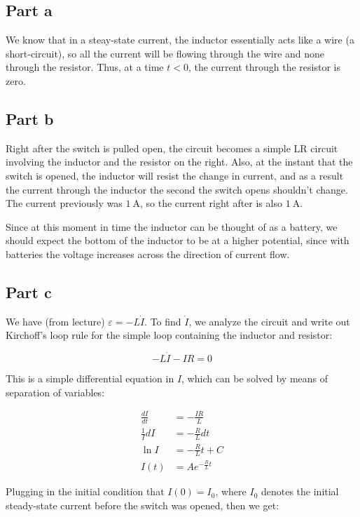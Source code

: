\documentclass{article}
\theoremstyle{definition}
\numberwithin{equation}{section}
\numberwithin{definition}{section}
\begin{document}
\subsection*{Part a} 

We know that in a steay-state current, the inductor essentially acts like a wire (a short-circuit), so all the current will be flowing through the wire and none through the resistor. Thus, at a time $t < 0$, the current through the resistor is zero.

\subsection*{Part b}
Right after the switch is pulled open, the circuit becomes a simple LR circuit involving the inductor and the resistor on the right. Also, at the instant that the switch is opened, the inductor will resist the change in current, and as a result the current through the inductor the second the switch opens shouldn't change. The current previously was $1 \ \text{A}$, so the current right after is also $1 \ \text{A}$.

Since at this moment in time the inductor can be thought of as a battery, we should expect the bottom of the inductor to be at a higher potential, since with batteries the voltage increases across the direction of current flow.

\subsection*{Part c}

We have (from lecture) $\varepsilon = -L \dot I$. To find $\dot I$, we analyze the circuit and write out Kirchoff's loop rule for the simple loop containing the inductor and resistor:

\[ -L \dot I - IR = 0\]

This is a simple differential equation in $I$, which can be solved by means of separation of variables: 

\begin{align*}
    \frac{dI}{dt} &= - \frac{IR}{L}\\
    \frac{1}{I} dI &= -\frac{R}{L} dt\\
    \ln I &= -\frac{R}{L} t + C\\
    I(t) &= Ae^{-\frac{R}{L}t}
\end{align*}

Plugging in the initial condition that $I(0) = I_0$, where $I_0$ denotes the initial steady-state current before the switch was opened, then we get:
\end{document}
